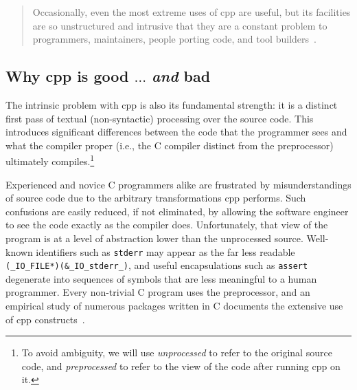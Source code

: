 \documentclass{article}
\newcommand{\Cpp}{\mbox{\textsf{cpp}}}
\newcommand{\C}{\mbox{C}}
\newcommand{\ie}{i.e.,}
\begin{document}
\begin{quotation}
\noindent Occasionally, even the most extreme uses of \Cpp{} are useful, but its
facilities are so unstructured and intrusive that they are a constant
problem to programmers, maintainers, people porting code, and tool
builders~\cite[p.~424]{Stroustrup94}.
\end{quotation}

\subsection{Why \Cpp{} is good $\ldots$ \emph{and} bad}

The intrinsic problem with \Cpp{} is also its fundamental strength: it
is a distinct first pass of textual (non-syntactic) processing over the
source code.  This introduces significant differences between the code
that the programmer sees and what the compiler proper (\ie{} the \C{}
compiler distinct from the preprocessor) ultimately
compiles.\footnote{To avoid ambiguity, we will use \emph{unprocessed} to
  refer to the original source code, and \emph{preprocessed} to refer to
  the view of the code after running \Cpp{} on it.}

Experienced and novice \C{} programmers alike are frustrated by
misunderstandings of source code due to the arbitrary transformations
\Cpp{} performs. Such confusions are easily reduced, if not eliminated,
by allowing the software engineer to see the code exactly as the
compiler does.  Unfortunately, that view of the program is at a level of
abstraction lower than the unprocessed source.  Well-known
identifiers such as \texttt{stderr} may appear as the far less readable
\texttt{(\_IO\_FILE*)(\&\_IO\_stderr\_)},
and useful encapsulations such as \texttt{assert} degenerate into
sequences of symbols that are less meaningful to a human programmer.  Every
non-trivial \C{} program uses the preprocessor, and an empirical study
of numerous packages written in \C{} documents the extensive use of \Cpp{}
constructs~\cite{EmpCpp-TR}.

\end{document}
